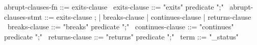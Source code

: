 \begin{syntax}
  abrupt-clauses-fn ::= exits-clause
  \
  exits-clause ::= "exits" predicate ";"
  \
  abrupt-clauses-stmt ::= exits-clause ;
        | breaks-clause | continues-clause | returns-clause
  \
  breaks-clause ::= "breaks" predicate ";"
  \
  continues-clause ::= "continues" predicate ";"
  \
  returns-clause ::= "returns" predicate ";"
  \
  term  ::= "\exit_status"
\end{syntax}